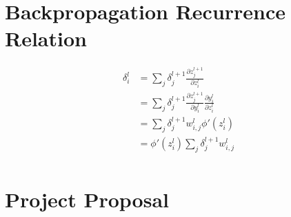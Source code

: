 \documentclass[a4paper, 12pt]{report}
\begin{document}
\appendix

\chapter{Backpropagation Recurrence Relation} \label{appendix:bp_recurrence}

\begin{align*}
	\delta_i^l &= \sum_j \delta_j^{l+1} \frac{\partial z_j^{l+1}}{\partial z_i^l} \\
	&= \sum_j \delta_j^{l+1} \frac{\partial z_j^{l+1}}{\partial y_i^l} \frac{\partial y_i^l}{\partial z_i^l} \\
	&= \sum_j \delta_j^{l+1} w_{i,j}^l \phi'(z_i^l) \\
	&= \phi'(z_i^l) \sum_j \delta_j^{l+1} w_{i,j}^l \\
\end{align*}

\chapter{Project Proposal}
\end{document}
